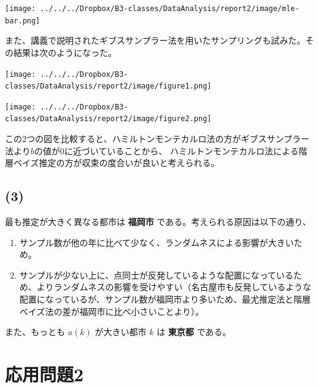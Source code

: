 \documentclass[a4j,xelatex,ja=standard,jafont=hiragino-pron, 9pt]{bxjsarticle}
\let\origfigure=\figure
\let\endorigfigure=\endfigure
\renewenvironment{figure}[1][]{%
  \origfigure[H]
}{%
  \endorigfigure
}
\def\tightlist{\itemsep1pt\parskip0pt\parsep0pt}
\begin{document}
\begin{figure}
  \centering
  \texttt{[image: ../../../Dropbox/B3-classes/DataAnalysis/report2/image/mle-bar.png]}
  \caption{ハミルトンモンテカルロ法と最尤推定法の$a$ と $b$ の値の比較}
  \label{}
\end{figure}

また、講義で説明されたギブスサンプラー法を用いたサンプリングも試みた。その結果は次のようになった。

\begin{figure}
  \centering
  \texttt{[image: ../../../Dropbox/B3-classes/DataAnalysis/report2/image/figure1.png]}
  \caption{ギブスサンプラー法と最尤推定法の比較}
\end{figure}

\begin{figure}
  \centering
  \texttt{[image: ../../../Dropbox/B3-classes/DataAnalysis/report2/image/figure2.png]}
  \caption{ギブスサンプラー法と最尤推定法の $a$ と $b$ の比較}
  \label{}
\end{figure}

この2つの図を比較すると、ハミルトンモンテカルロ法の方がギブスサンプラー法より$b$の値が0に近づいていることから、
ハミルトンモンテカルロ法による階層ベイズ推定の方が収束の度合いが良いと考えられる。

\subsection*{(3)}

最も推定が大きく異なる都市は \textbf{福岡市}
である。考えられる原因は以下の通り、

\begin{enumerate}
\def\labelenumi{\arabic{enumi}.}
\tightlist
\item
  サンプル数が他の年に比べて少なく、ランダムネスによる影響が大きいため。
\item
  サンプルが少ない上に、点同士が反発しているような配置になっているため、よりランダムネスの影響を受けやすい（名古屋市も反発しているような配置になっているが、サンプル数が福岡市より多いため、最尤推定法と階層ベイズ法の差が福岡市に比べ小さいことより）。
\end{enumerate}

また、もっとも \(a(k)\) が大きい都市 \(k\) は \textbf{東京都} である。

\section*{応用問題2}
\end{document}
